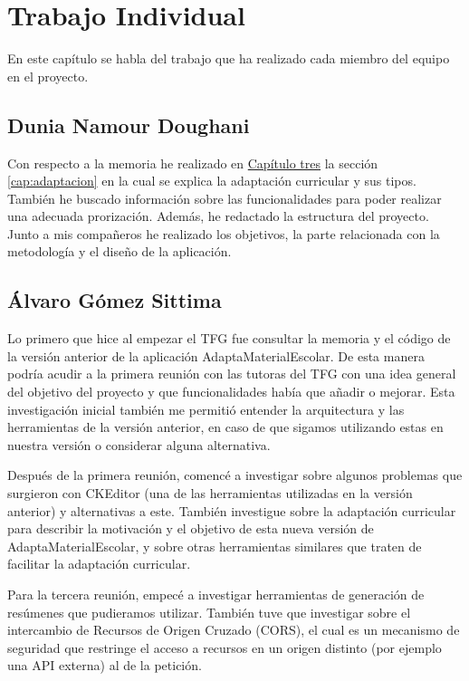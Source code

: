 \chapter{Trabajo Individual}
\label{cap:TrabajoIndividual}

En este capítulo se habla del trabajo que ha realizado cada miembro del equipo en el proyecto.

\section{Dunia Namour Doughani}
Con respecto a la memoria he realizado en {\hyperref[cap:estadoDelArte]{Capítulo tres}} la sección \ref{cap:adaptacion} en la cual se explica la adaptación curricular y sus tipos. También he buscado información sobre las funcionalidades para poder realizar una adecuada prorización. Además, he redactado la estructura del proyecto. Junto a mis compañeros he realizado los objetivos, la parte relacionada con la metodología y el diseño de la aplicación.

\section{Álvaro Gómez Sittima}
Lo primero que hice al empezar el TFG fue consultar la memoria y el código de la versión anterior de la aplicación AdaptaMaterialEscolar. De esta manera podría acudir a la primera reunión con las tutoras del TFG con una idea general del objetivo del proyecto y que funcionalidades había que añadir o mejorar. Esta investigación inicial también me permitió entender la arquitectura y las herramientas de la versión anterior, en caso de que sigamos utilizando estas en nuestra versión o considerar alguna alternativa.

Después de la primera reunión, comencé a investigar sobre algunos problemas que surgieron con CKEditor (una de las herramientas utilizadas en la versión anterior) y alternativas a este. También investigue sobre la adaptación curricular para describir la motivación y el objetivo de esta nueva versión de AdaptaMaterialEscolar, y sobre otras herramientas similares que traten de facilitar la adaptación curricular.

Para la tercera reunión, empecé a investigar herramientas de generación de resúmenes que pudieramos utilizar. También tuve que investigar sobre el intercambio de Recursos de Origen Cruzado (CORS), el cual es un mecanismo de seguridad que restringe el acceso a recursos en un origen distinto (por ejemplo una API externa) al de la petición.